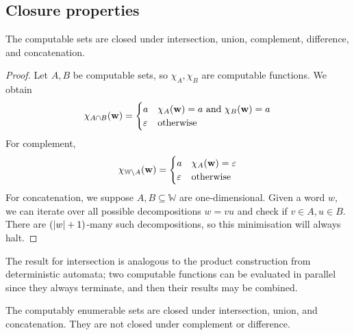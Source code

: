 \subsection{Closure properties}
\begin{proposition}
	The computable sets are closed under intersection, union, complement, difference, and concatenation.
\end{proposition}
\begin{proof}
	Let \( A, B \) be computable sets, so \( \chi_A, \chi_B \) are computable functions.
	We obtain
	\[ \chi_{A \cap B}(\vb w) = \begin{cases}
		a & \chi_A(\vb w) = a \text{ and } \chi_B(\vb w) = a \\
		\varepsilon & \text{otherwise}
	\end{cases} \]
	For complement,
	\[ \chi_{\mathbb W \setminus A}(\vb w) = \begin{cases}
		a & \chi_A(\vb w) = \varepsilon \\
		\varepsilon & \text{otherwise}
	\end{cases} \]
	For concatenation, we suppose \( A, B \subseteq \mathbb W \) are one-dimensional.
	Given a word \( w \), we can iterate over all possible decompositions \( w = vu \) and check if \( v \in A, u \in B \).
	There are \( (\abs{w} + 1) \)-many such decompositions, so this minimisation will always halt.
\end{proof}
\begin{remark}
	The result for intersection is analogous to the product construction from deterministic automata; two computable functions can be evaluated in parallel since they always terminate, and then their results may be combined.
\end{remark}
\begin{proposition}
	The computably enumerable sets are closed under intersection, union, and concatenation.
	They are not closed under complement or difference.
\end{proposition}
